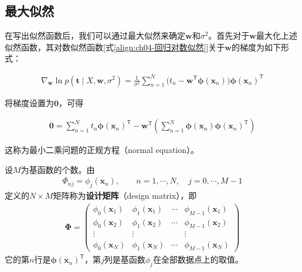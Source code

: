 \documentclass[../../main.tex]{subfiles}
\begin{document}
\subsection{最大似然}\label{subsection:ch04-最大似然}

在写出似然函数后，我们可以通过最大似然来确定$\boldsymbol{w}$和$\sigma^2$。首先对于$\boldsymbol{w}$最大化上述似然函数，其对数似然函数[式\eqref{align:ch04-回归对数似然}]关于$\boldsymbol{w}$的梯度为如下形式：

\begin{align}
  \nabla_{\boldsymbol{w}}\ln p(\boldsymbol{t}\mid X,\boldsymbol{w},\sigma^2)
  =\frac{1}{\sigma^2}\sum_{n=1}^{N}\bigl(t_n-\boldsymbol{w}^{\mathsf{T}}\boldsymbol{\phi}(\boldsymbol{x}_n)\bigr)\boldsymbol{\phi}(\boldsymbol{x}_n)^{\mathsf{T}}
  \label{align:ch04-似然梯度}
\end{align}

将梯度设置为$\boldsymbol{0}$，可得

\begin{align}
  \boldsymbol{0}=\sum_{n=1}^{N}t_n\boldsymbol{\phi}(\boldsymbol{x}_n)^{\mathsf{T}}
  -\boldsymbol{w}^{\mathsf{T}}\left(\sum_{n=1}^{N}\boldsymbol{\phi}(\boldsymbol{x}_n)\boldsymbol{\phi}(\boldsymbol{x}_n)^{\mathsf{T}}\right)
  \label{align:ch04-正规方程}
\end{align}

这称为最小二乘问题的正规方程（normal equation）。

\begin{definition}[设计矩阵]\label{definition:ch04-设计矩阵}
设$M$为基函数的个数。由
\begin{align}
  \Phi_{nj}=\phi_j(\boldsymbol{x}_n),\qquad n=1,\cdots,N,\quad j=0,\cdots,M-1
  \label{align:ch04-设计矩阵元}
\end{align}
定义的$N\times M$矩阵称为\textbf{设计矩阵}（design matrix），即
\begin{align}
  \boldsymbol{\Phi}=
  \begin{pmatrix}
    \phi_0(\boldsymbol{x}_1) & \phi_1(\boldsymbol{x}_1) & \cdots & \phi_{M-1}(\boldsymbol{x}_1)\\
    \phi_0(\boldsymbol{x}_2) & \phi_1(\boldsymbol{x}_2) & \cdots & \phi_{M-1}(\boldsymbol{x}_2)\\
    \vdots & \vdots & & \vdots\\
    \phi_0(\boldsymbol{x}_N) & \phi_1(\boldsymbol{x}_N) & \cdots & \phi_{M-1}(\boldsymbol{x}_N)
  \end{pmatrix}
  \label{align:ch04-设计矩阵}
\end{align}
它的第$n$行是$\boldsymbol{\phi}(\boldsymbol{x}_n)^{\mathsf{T}}$，第$j$列是基函数$\phi_j$在全部数据点上的取值。
\end{definition}
\end{document}
